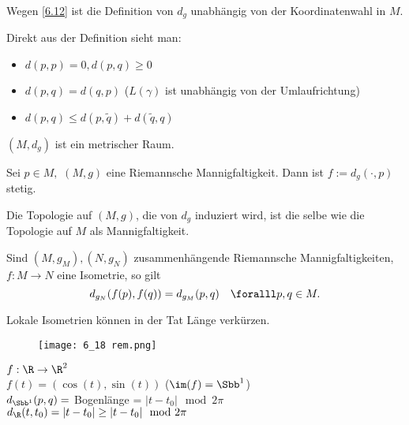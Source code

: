 \lecture\begin{rem}
	Wegen \ref{6.12} ist die Definition von $d_g$ unabhängig von der Koordinatenwahl in $M$.
\end{rem}

\begin{rem}
	Direkt aus der Definition sieht man:
	\begin{itemize}
		\item $ d(p,p) = 0, d(p,q) \geq 0 $
		\item $ d(p,q) = d(q,p) $ ($L(\gamma)$ ist unabhängig von der Umlaufrichtung)
		\item $ d(p,q) \leq d(p,\tilde{q}) + d(\tilde{q},q) $
	\end{itemize}
\end{rem}

\begin{thm}
	$ (M,d_g) $ ist ein metrischer Raum.
\end{thm}

\begin{lem}
	Sei $ p \in M,$ $(M,g) $ eine Riemannsche Mannigfaltigkeit. Dann ist $ f:= d_g(\cdot,p) $ stetig.
\end{lem}

\begin{cor}
	Die Topologie auf $ (M,g) $, die von $d_g$ induziert wird, ist die selbe wie die Topologie auf $M$ als Mannigfaltigkeit.
\end{cor}

\begin{lem}
	Sind $ (M,g_M), (N,g_N) $ zusammenhängende Riemannsche Mannigfaltigkeiten, $ f:M \to N $ eine Isometrie, so gilt
	\[ d_{g_N}(f(p),f(q)) = d_{g_M}(p,q) \quad \foralll p,q \in M. \]
\end{lem}

\begin{rem*}
	Lokale Isometrien können in der Tat Länge verkürzen.\\
	\begin{minipage}{\linewidth}
		\begin{wrapfigure}{r}{4cm}
			\texttt{[image: 6\_18 rem.png]}
		\end{wrapfigure}
		$ f: \R \to \R^2$\\
		$f(t) = (\cos(t),\sin(t)) $ ($ \im(f) = \Sbb^1 $)\\
		$ d_{\Sbb^1}(p,q) = $ Bogenlänge = $ |t-t_0| \mod 2\pi $\\
		$ d_\R(t,t_0) = |t-t_0| \geq |t-t_0| \mod 2\pi $
	\end{minipage}
\end{rem*}

